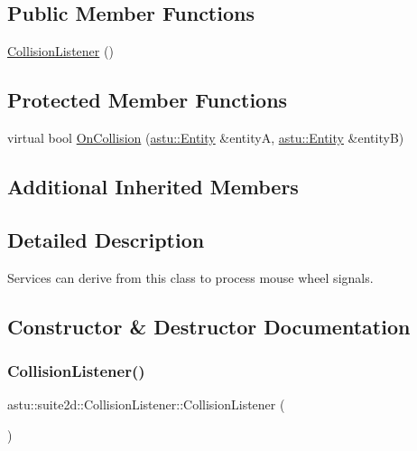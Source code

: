 \subsection*{Public Member Functions}
\begin{DoxyCompactItemize}
\item 
\hyperlink{classastu_1_1suite2d_1_1CollisionListener_ac8450939232e333a3f3de7b8f0a08fd7}{Collision\+Listener} ()
\end{DoxyCompactItemize}
\subsection*{Protected Member Functions}
\begin{DoxyCompactItemize}
\item 
virtual bool \hyperlink{classastu_1_1suite2d_1_1CollisionListener_a784ca22e86d659d042aaab818c488a56}{On\+Collision} (\hyperlink{classastu_1_1Entity}{astu\+::\+Entity} \&entityA, \hyperlink{classastu_1_1Entity}{astu\+::\+Entity} \&entityB)
\end{DoxyCompactItemize}
\subsection*{Additional Inherited Members}


\subsection{Detailed Description}
Services can derive from this class to process mouse wheel signals. 

\subsection{Constructor \& Destructor Documentation}
\mbox{\label{classastu_1_1suite2d_1_1CollisionListener_ac8450939232e333a3f3de7b8f0a08fd7}} 
\subsubsection{\texorpdfstring{Collision\+Listener()}{CollisionListener()}}
{\footnotesize\ttfamily astu\+::suite2d\+::\+Collision\+Listener\+::\+Collision\+Listener (\begin{DoxyParamCaption}{ }\end{DoxyParamCaption})\hspace{0.3cm}{\ttfamily [inline]}}

